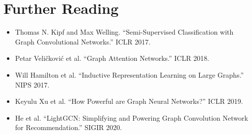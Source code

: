 \documentclass{article}
\begin{document}
\section*{Further Reading}
\begin{itemize}
  \item Thomas N. Kipf and Max Welling. ``Semi-Supervised Classification with Graph Convolutional Networks.'' ICLR 2017.
  \item Petar Veličković et al. ``Graph Attention Networks.'' ICLR 2018.
  \item Will Hamilton et al. ``Inductive Representation Learning on Large Graphs.'' NIPS 2017.
  \item Keyulu Xu et al. ``How Powerful are Graph Neural Networks?'' ICLR 2019.
  \item He et al. ``LightGCN: Simplifying and Powering Graph Convolution Network for Recommendation.'' SIGIR 2020.
\end{itemize}
\end{document}

